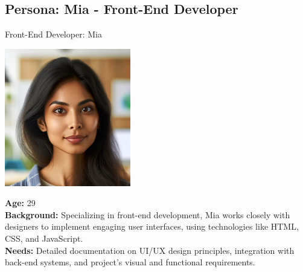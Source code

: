\subsection*{Persona: Mia - Front-End Developer}
\begin{persona}{Front-End Developer: Mia}
\begin{tcbraster}[raster columns=2, raster column skip=5mm]
  \begin{tcolorbox}[width=0.2\linewidth, colback=white, colframe=white, boxrule=0pt, halign=center]
   \includegraphics[width=\linewidth, height=6cm, keepaspectratio]{Images/Mia.jpg}
  \end{tcolorbox}
  \begin{tcolorbox}[width=0.8\linewidth, colback=white, colframe=white, boxrule=0pt]
    \textbf{Age:} 29\\
    \textbf{Background:} Specializing in front-end development, Mia works closely with designers to implement engaging user interfaces, using technologies like HTML, CSS, and JavaScript.\\
    \textbf{Needs:} Detailed documentation on UI/UX design principles, integration with back-end systems, and project's visual and functional requirements.
  \end{tcolorbox}
\end{tcbraster}
\end{persona}

